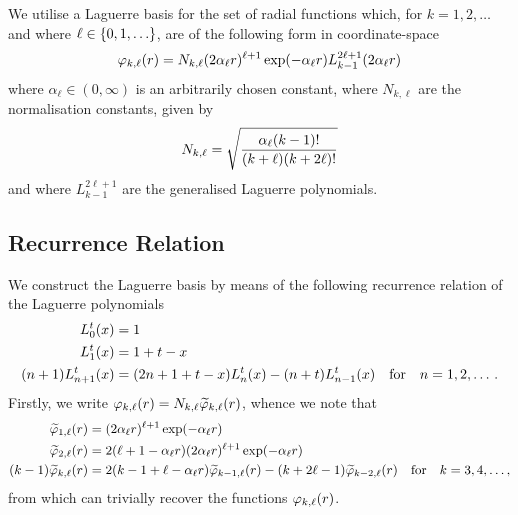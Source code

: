 \documentclass[]{article}
\begin{document}
We utilise a Laguerre basis for the set of radial functions which,
for $k = 1, 2, \dotsc$ and where $\ell \in \lrset{0, 1, \dotsc}$, are of the
following form in coordinate-space
\begin{equation*}
  \varphi_{k, \ell}\lr{r}
  =
  N_{k, \ell}
  \lr
  {
    2
    \alpha_{\ell}
    r
  }^{\ell + 1}
  \exponential\lr
  {
    -
    \alpha_{\ell}
    r
  }
  L_{k - 1}^{2 \ell + 1}\lr{2 \alpha_{\ell} r}
\end{equation*}
where $\alpha_{\ell} \in (0, \infty)$ is an arbitrarily chosen constant,
where $N_{k, \ell}$ are the normalisation constants, given by
\begin{equation*}
  N_{k, \ell}
  =
  \sqrt
  {
    \dfrac
    {
      \alpha_{\ell}
      (k - 1)!
    }
    {
      (k + \ell)
      (k + 2 \ell)!
    }
  }
\end{equation*}
and where $L_{k - 1}^{2 \ell + 1}$ are the generalised Laguerre polynomials.

\subsection{Recurrence Relation}
\label{sec:recurrence-relation}

We construct the Laguerre basis by means of the following recurrence relation of
the Laguerre polynomials
\begin{alignat*}{2}
  L_{0}^{t}\lr{x}
  {}={}
  &
  1
  \\
  L_{1}^{t}\lr{x}
  {}={}
  &
  1
  +
  t
  -
  x
  \\
  \lr{n + 1}
  L_{n + 1}^{t}\lr{x}
  {}={}
  &
  \lr
  {
    2
    n
    +
    1
    +
    t
    -
    x
  }
  L_{n}^{t}\lr{x}
  -
  \lr{n + t}
  L_{n - 1}^{t}\lr{x}
  \qq{for}
  n = 1, 2, \dotsc.
\end{alignat*}
Firstly, we write
$\varphi_{k, \ell}(r) = N_{k, \ell}\widetilde{\varphi}_{k, \ell}(r)$,
whence we note that
\begin{alignat*}{2}
  \widetilde{\varphi}_{1, \ell}\lr{r}
  {}={}
  &
  \lr
  {
    2
    \alpha_{\ell}
    r
  }^{\ell + 1}
  \exponential\lr
  {
    -
    \alpha_{\ell}
    r
  }
  \\
  \widetilde{\varphi}_{2, \ell}\lr{r}
  {}={}
  &
  2
  \lr
  {
    \ell
    +
    1
    -
    \alpha_{\ell}
    r
  }
  \lr
  {
    2
    \alpha_{\ell}
    r
  }^{\ell + 1}
  \exponential\lr
  {
    -
    \alpha_{\ell}
    r
  }
  \\
  \lr{k - 1}
  \widetilde{\varphi}_{k, \ell}\lr{r}
  {}={}
  &
  2
  \lr
  {
    k
    -
    1
    +
    \ell
    -
    \alpha_{\ell}
    r
  }
  \widetilde{\varphi}_{k - 1, \ell}\lr{r}
  -
  \lr
  {
    k
    +
    2
    \ell
    -
    1
  }
  \widetilde{\varphi}_{k - 2, \ell}\lr{r}
  \qq{for}
  k = 3, 4, \dotsc,
\end{alignat*}
from which can trivially recover the functions $\varphi_{k, \ell}(r)$.
\end{document}
